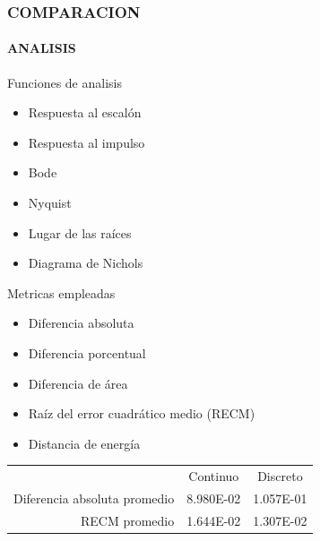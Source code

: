 \documentclass[usenames,xcolor={dvipsnames, table}]{beamer}
\begin{document}
\begin{frame}
	\frametitle{COMPARACION}
	\framesubtitle{ANALISIS}
	\vspace{21pt}
	\small
	\begin{block}{Funciones de analisis}
		\footnotesize
		\begin{multicols}{2}
		\begin{itemize}
			\item Respuesta al escalón
			\item Respuesta al impulso
			\item Bode
			\item Nyquist
			\item Lugar de las raíces 
			\item Diagrama de Nichols
		\end{itemize}
	\end{multicols}
	\end{block}

	\begin{block}{Metricas empleadas}
		\footnotesize
		\begin{multicols}{2}
		\begin{itemize}
			\item Diferencia absoluta
			\item Diferencia porcentual
			\item Diferencia de área
			\item Raíz del error cuadrático medio (RECM)
			\item Distancia de energía
		\end{itemize}
	\end{multicols}
	\end{block}

	\vspace{-5pt}
	\begin{table}
		\begin{tabular}{rcc}
										& Continuo 			& Discreto 			\\
		Diferencia absoluta promedio	& \num{8.980E-02}	& \num{1.057E-01}	\\
		RECM promedio					& \num{1.644E-02}	& \num{1.307E-02} 	\\
		\end{tabular}
	\end{table}
\end{frame}
\end{document}
